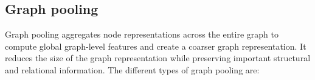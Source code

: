 \subsection{Graph pooling}
Graph pooling aggregates node representations across the entire graph to compute global graph-level features and create a coarser graph representation. It reduces the size of the graph representation while preserving important structural and relational information. The different types of graph pooling are:
